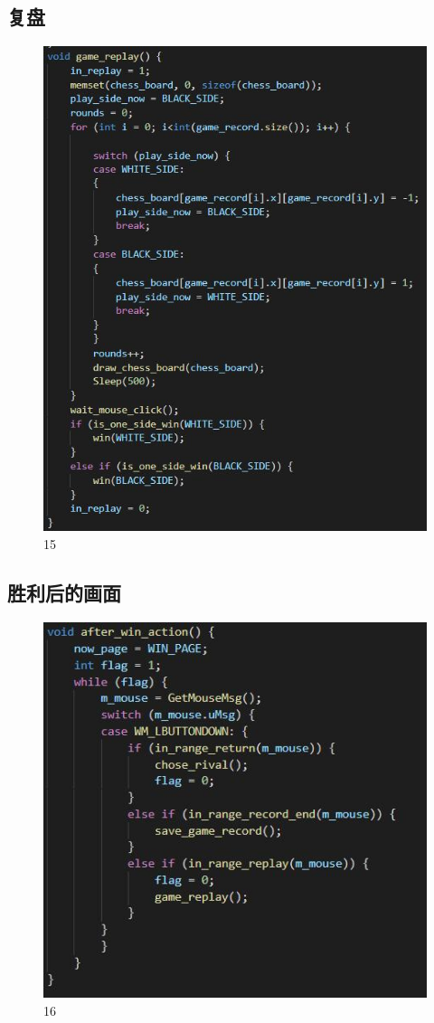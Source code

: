 \documentclass[UTF8]{ctexart}
\begin{document}
\subsection{复盘}
\begin{figure}[H]
    \centering
    \includegraphics[scale=1.0]{14.jpg}
\caption{15}
\end{figure}
\subsection{胜利后的画面}
\begin{figure}[H]
    \centering
    \includegraphics[scale=1.0]{15.jpg}
\caption{16}
\end{figure}
\end{document}
